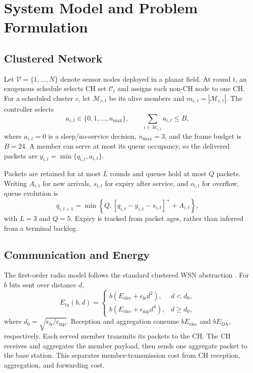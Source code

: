 \documentclass[journal]{IEEEtran}
\begin{document}
\section{System Model and Problem Formulation}

\subsection{Clustered Network}

Let $\mathcal{V}=\{1,\ldots,N\}$ denote sensor nodes deployed in a planar
field. At round $t$, an exogenous schedule selects CH set $\mathcal{C}_t$ and
assigns each non-CH node to one CH. For a scheduled cluster $c$, let
$\mathcal{M}_{c,t}$ be its alive members and $m_{c,t}=|\mathcal{M}_{c,t}|$.
The controller selects
\begin{equation}
 a_{i,t}\in\{0,1,\ldots,n_{\max}\},\qquad
 \sum_{i\in\mathcal{M}_{c,t}}a_{i,t}\leq B,
 \label{eq:budget}
\end{equation}
where $a_{i,t}=0$ is a sleep/no-service decision, $n_{\max}=3$, and the frame
budget is $B=24$. A member can serve at most its queue occupancy, so the
delivered packets are $y_{i,t}=\min\{q_{i,t},a_{i,t}\}$.

Packets are retained for at most $L$ rounds and queues hold at most $Q$ packets.
Writing $A_{i,t}$ for new arrivals, $s_{i,t}$ for expiry after service, and
$o_{i,t}$ for overflow, queue evolution is
\begin{equation}
 q_{i,t+1}=\min\!\left\{Q,
 [q_{i,t}-y_{i,t}-s_{i,t}]^{+}+A_{i,t}\right\},
 \label{eq:queue}
\end{equation}
with $L=3$ and $Q=5$. Expiry is tracked from packet ages, rather than inferred
from a terminal backlog.

\subsection{Communication and Energy}

The first-order radio model follows the standard clustered WSN abstraction
\cite{heinzelman2000leach}. For $b$ bits sent over distance $d$,
\begin{equation}
 E_{\mathrm{tx}}(b,d)=
 \begin{cases}
 b(E_{\mathrm{elec}}+\epsilon_{\mathrm{fs}}d^2),&d<d_0,\\
 b(E_{\mathrm{elec}}+\epsilon_{\mathrm{mp}}d^4),&d\ge d_0,
 \end{cases}
 \label{eq:radio}
\end{equation}
where $d_0=\sqrt{\epsilon_{\mathrm{fs}}/\epsilon_{\mathrm{mp}}}$.
Reception and aggregation consume $bE_{\mathrm{elec}}$ and $bE_{\mathrm{DA}}$,
respectively. Each served member transmits its packets to the CH. The CH
receives and aggregates the member payload, then sends one aggregate packet to
the base station. This separates member-transmission cost from CH reception,
aggregation, and forwarding cost.
\end{document}
